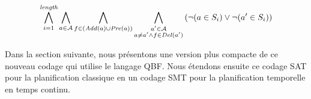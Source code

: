\begin{small}
\[
\bigwedge\limits_{\substack{i=1}}^{\textit{length}}\bigwedge\limits_{\substack{\substack{a\in \mathcal{A}}}}\bigwedge\limits_{\substack{\substack{f\in \left(\mathit{Add}(a)\cup\mathit{Pre}(a)\right)}}}\bigwedge\limits_{\substack{\substack{a'\in \mathcal{A}\\a \neq a' \wedge f \in \mathit{Del}(a')}}}\left(\neg (a \in S_{i}) \vee \neg (a' \in S_{i})\right)
\]
\end{small}


Dans la section suivante, nous présentons une version plus compacte de ce nouveau codage qui utilise le langage QBF. Nous étendons ensuite ce codage SAT pour la planification classique en un codage SMT pour la planification temporelle en temps continu.

